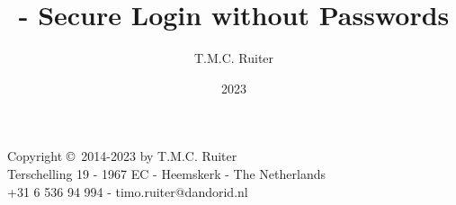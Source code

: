 %
%



\begin{titlepage}
\title{\TIMO - Secure Login without Passwords}
\author{T.M.C. Ruiter}
\date{2023}
\maketitle
\begin{center}
\small
Copyright \copyright\ 2014-2023 by T.M.C. Ruiter\\
Terschelling 19 - 1967 EC - Heemskerk - The Netherlands\\
+31 6 536 94 994 - timo.ruiter@dandorid.nl
\normalsize
\end{center}
\end{titlepage}



